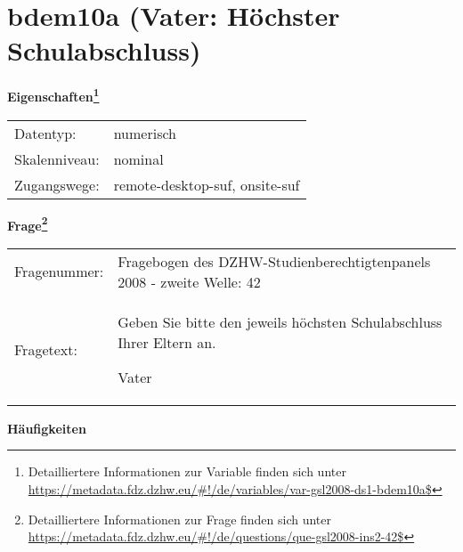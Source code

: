 
    \setcounter{footnote}{0}

    \vspace*{-1.8cm}
	\section{bdem10a (Vater: Höchster Schulabschluss)}
	\label{section:bdem10a}



    \vspace*{0.5cm}
    \noindent\textbf{Eigenschaften\footnote{Detailliertere Informationen zur Variable finden sich unter
		\url{https://metadata.fdz.dzhw.eu/\#!/de/variables/var-gsl2008-ds1-bdem10a$}}}\\
	\begin{tabularx}{\hsize}{@{}lX}
	Datentyp: & numerisch \\
	Skalenniveau: & nominal \\
	Zugangswege: &
	  remote-desktop-suf, 
	  onsite-suf
 \\
    \end{tabularx}



				\vspace*{0.5cm}
                \noindent\textbf{Frage\footnote{Detailliertere Informationen zur Frage finden sich unter
		              \url{https://metadata.fdz.dzhw.eu/\#!/de/questions/que-gsl2008-ins2-42$}}}\\
				\begin{tabularx}{\hsize}{@{}lX}
					Fragenummer: &
					  Fragebogen des DZHW-Studienberechtigtenpanels 2008 - zweite Welle:
					  42
 \\
					Fragetext: & Geben Sie bitte den jeweils höchsten Schulabschluss Ihrer Eltern an.\par  Vater \\
				\end{tabularx}





        		\vspace*{0.5cm}
                \noindent\textbf{Häufigkeiten}


